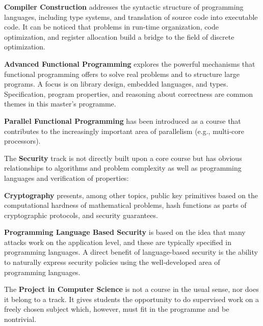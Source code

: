 \documentclass[11pt]{article}
\begin{document}
{\bf Compiler Construction} addresses the syntactic structure of programming 
languages, including type systems, and translation of source code into
executable code. It can be noticed that problems in run-time organization, 
code optimization, and register allocation build a bridge to the field of
discrete optimization.

{\bf Advanced Functional Programming} explores the powerful mechanisms that 
functional programming offers to solve real problems and to structure large programs. A focus is on library design, embedded languages, and types.
Specification, program properties, and reasoning about correctness are common 
themes in this master's programme.

{\bf Parallel Functional Programming} has been introduced as a course that 
contributes to the increasingly important area of parallelism (e.g., multi-core 
processors).

\bigskip
The {\bf Security} track is not directly built upon a core course but has obvious relationships to algorithms and problem complexity as well as programming languages and verification of properties: 

{\bf Cryptography} presents, among other topics, public key primitives based 
on the computational hardness of mathematical problems, hash functions as 
parts of cryptographic protocols, and security guarantees.

{\bf Programming Language Based Security} is based on the idea that many 
attacks work on the application level, and these are typically specified in 
programming languages. A direct benefit of language-based security is the 
ability to naturally express security policies using the well-developed area 
of programming languages.

\bigskip
The {\bf Project in Computer Science} is not a course in the usual sense, nor 
does it belong to a track. It gives students the opportunity to do supervised 
work on a freely chosen subject which, however, must fit in the programme and 
be nontrivial.
\end{document}
